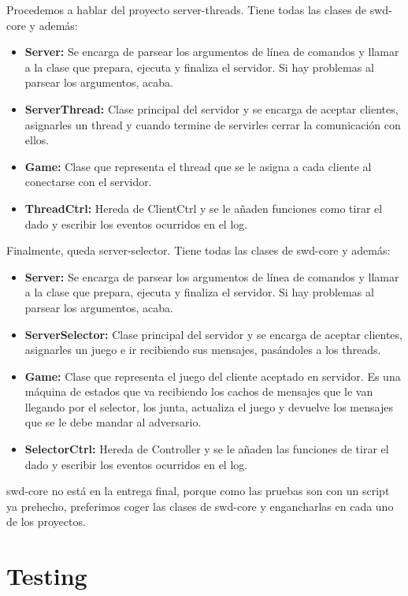 Procedemos a hablar del proyecto server-threads. Tiene todas las clases de swd-core y además:
\begin{itemize}
\item \textbf{Server:} Se encarga de parsear los argumentos de línea de comandos y llamar a la clase que prepara, ejecuta y finaliza el servidor. Si hay problemas al parsear los argumentos, acaba.
\item \textbf{ServerThread:} Clase principal del servidor y se encarga de aceptar clientes, asignarles un thread y cuando termine de servirles cerrar la comunicación con ellos.
\item \textbf{Game:} Clase que representa el thread que se le asigna a cada cliente al conectarse con el servidor.
\item \textbf{ThreadCtrl:} Hereda de ClientCtrl y se le añaden funciones como tirar el dado y escribir los eventos ocurridos en el log.
\end{itemize}

Finalmente, queda server-selector. Tiene todas las clases de swd-core y además:
\begin{itemize}
\item \textbf{Server:} Se encarga de parsear los argumentos de línea de comandos y llamar a la clase que prepara, ejecuta y finaliza el servidor. Si hay problemas al parsear los argumentos, acaba.
\item \textbf{ServerSelector:} Clase principal del servidor y se encarga de aceptar clientes, asignarles un juego e ir recibiendo sus mensajes, pasándoles a los threads.
\item \textbf{Game:} Clase que representa el juego del cliente aceptado en servidor. Es una máquina de estados que va recibiendo los cachos de mensajes que le van llegando por el selector, los junta, actualiza el juego y devuelve los mensajes que se le debe mandar al adversario.
\item \textbf{SelectorCtrl:} Hereda de Controller y se le añaden las funciones de tirar el dado y escribir los eventos ocurridos en el log.
\end{itemize}

swd-core no está en la entrega final, porque como las pruebas son con un script ya prehecho, preferimos coger las clases de swd-core y engancharlas en cada uno de los proyectos.

\newpage
\section{Testing}
